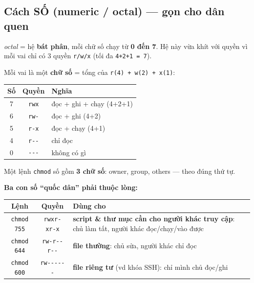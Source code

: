 \documentclass[12pt,a4paper]{article}
\newcommand{\cmd}[1]{\texttt{#1}}
\begin{document}
\subsection{Cách SỐ (numeric / octal) --- gọn cho dân quen}

\begin{notebox}
\textit{octal} = hệ \textbf{bát phân}, mỗi chữ số chạy từ \textbf{0 đến 7}. Hệ này
vừa khít với quyền vì mỗi vai chỉ có 3 quyền \cmd{r/w/x} (tối đa \cmd{4+2+1 = 7}).
\end{notebox}

Mỗi vai là một \textbf{chữ số} = tổng của \cmd{r(4) + w(2) + x(1)}:

\begin{center}
\begin{tabular}{|c|c|>{\raggedright\arraybackslash}p{6cm}|}
\hline
\rowcolor{tablehead}\textbf{Số} & \textbf{Quyền} & \textbf{Nghĩa} \\
\hline
7 & \cmd{rwx} & đọc + ghi + chạy (4+2+1) \\
\hline
6 & \cmd{rw-} & đọc + ghi (4+2) \\
\hline
5 & \cmd{r-x} & đọc + chạy (4+1) \\
\hline
4 & \cmd{r-{}-} & chỉ đọc \\
\hline
0 & \cmd{-{}-{}-} & không có gì \\
\hline
\end{tabular}
\end{center}

Một lệnh \cmd{chmod} số gồm \textbf{3 chữ số}: owner, group, others --- theo đúng
thứ tự.

\textbf{Ba con số ``quốc dân'' phải thuộc lòng:}

\begin{center}
\begin{tabular}{|c|c|>{\raggedright\arraybackslash}p{7.5cm}|}
\hline
\rowcolor{tablehead}\textbf{Lệnh} & \textbf{Quyền} & \textbf{Dùng cho} \\
\hline
\cmd{chmod 755} & \cmd{rwxr-xr-x} & \textbf{script \& thư mục cần cho người khác
truy cập}: chủ làm tất, người khác đọc/chạy/vào được \\
\hline
\cmd{chmod 644} & \cmd{rw-r-{}-r-{}-} & \textbf{file thường}: chủ sửa, người khác
chỉ đọc \\
\hline
\cmd{chmod 600} & \cmd{rw-{}-{}-{}-{}-{}-} & \textbf{file riêng tư} (vd khóa SSH):
chỉ mình chủ đọc/ghi \\
\hline
\end{tabular}
\end{center}
\end{document}
